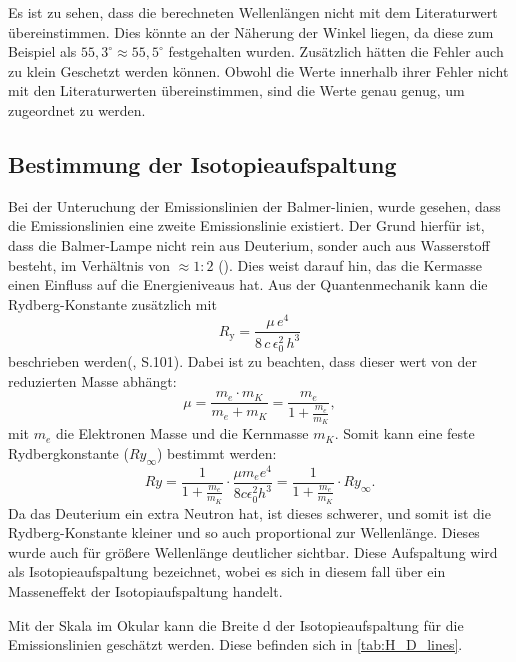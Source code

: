 Es ist zu sehen, dass die berechneten Wellenlängen nicht mit dem Literaturwert übereinstimmen. 
Dies könnte an der Näherung der Winkel liegen, da diese zum Beispiel als $55,3^\circ \approx 55,5^\circ$ festgehalten wurden.
Zusätzlich hätten die Fehler auch zu klein Geschetzt werden können.
Obwohl die Werte innerhalb ihrer Fehler nicht mit den Literaturwerten übereinstimmen, sind die Werte genau genug, um zugeordnet zu werden. 


\subsection{Bestimmung der Isotopieaufspaltung}

Bei der Unteruchung der Emissionslinien der Balmer-linien, wurde gesehen, dass die Emissionslinien eine zweite Emissionslinie existiert.
Der Grund hierfür ist, dass die Balmer-Lampe nicht rein aus Deuterium, sonder auch aus Wasserstoff besteht, im Verhältnis von $\approx 1 : 2$ (\cite{praktikum}). 
Dies weist darauf hin, das die Kermasse einen Einfluss auf die Energieniveaus hat. 
Aus der Quantenmechanik kann die Rydberg-Konstante zusätzlich mit 
\begin{equation}
  R_{\mathrm{y}} = \frac{\mu\,e^4}{8\,c\,\epsilon_0^2\,h^3}
\end{equation}
beschrieben werden(\cite{Demtröder_Ex3}, S.101). Dabei ist zu beachten, dass dieser wert von der reduzierten Masse abhängt:
\begin{equation}
    \mu = \frac{m_e \cdot m_K}{m_e + m_K} = \frac{m_e}{1+\frac{m_e}{m_K}},
\end{equation}
mit $m_e$ die Elektronen Masse und die Kernmasse $m_K$.
Somit kann eine feste Rydbergkonstante ($Ry_\infty$) bestimmt werden: 
\begin{equation}
    Ry = \frac{1}{1+\frac{m_e}{m_K}}\cdot \frac{\mu m_e e^4}{8c \epsilon_0^2h^3} = \frac{1}{1 + \frac{m_e}{m_K}}\cdot Ry_\infty.
\end{equation}
Da das Deuterium ein extra Neutron hat, ist dieses schwerer, und somit ist die Rydberg-Konstante kleiner und so auch proportional zur Wellenlänge. 
Dieses wurde auch für größere Wellenlänge deutlicher sichtbar.
Diese Aufspaltung wird als Isotopieaufspaltung bezeichnet, wobei es sich in diesem fall über ein Masseneffekt der Isotopiaufspaltung handelt.

Mit der Skala im Okular kann die Breite d der Isotopieaufspaltung für die Emissionslinien geschätzt werden. 
Diese befinden sich in \cref{tab:H_D_lines}.

